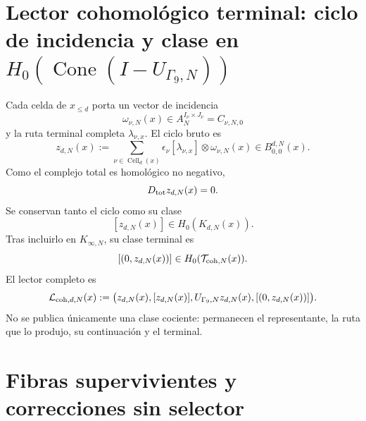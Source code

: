 \section{Lector cohomológico terminal: ciclo de incidencia y clase en \(H_0(\operatorname{Cone}(I-U_{\Gamma_9,N}))\)}
\label{sec:pdfv2-coh-reader}

Cada celda de \(x_{\leq d}\) porta un vector de incidencia
\[
 \omega_{\nu,N}(x)
 \in A_N^{I_\nu\times J_\nu}=C_{\nu,N,0}
\]
y la ruta terminal completa \(\lambda_{\nu,x}\). El ciclo bruto es
\begin{equation}\label{eq:pdfv2-coh-z-cycle}
 z_{d,N}(x):=
 \sum_{\nu\in\operatorname{Cell}_d(x)}
 \epsilon_\nu[\lambda_{\nu,x}]
 \otimes\omega_{\nu,N}(x)
 \in B_{0,0}^{d,N}(x).
\end{equation}
Como el complejo total es homológico no negativo,
\begin{equation}\label{eq:pdfv2-coh-z-closed}
 D_{\rm tot}z_{d,N}(x)=0.
\end{equation}
Se conservan tanto el ciclo como su clase
\[
 [z_{d,N}(x)]\in H_0(K_{d,N}(x)).
\]
Tras incluirlo en \(K_{\infty,N}\), su clase terminal es
\[
 [(0,z_{d,N}(x))]
 \in H_0(\mathcal T_{{\rm coh},N}(x)).
\]
El lector completo es
\begin{equation}\label{eq:pdfv2-coh-reader-full}
 \mathcal L_{{\rm coh},d,N}(x)
 :=\bigl(
 z_{d,N}(x),[z_{d,N}(x)],
 U_{\Gamma_9,N}z_{d,N}(x),
 [(0,z_{d,N}(x))]
 \bigr).
\end{equation}
No se publica únicamente una clase cociente: permanecen el representante, la
ruta que lo produjo, su continuación y el terminal.

\section{Fibras supervivientes y correcciones sin selector}
\label{sec:pdfv2-coh-surviving-fibers}

